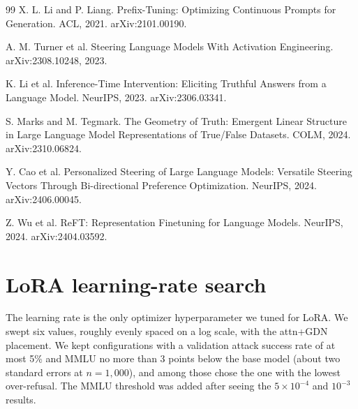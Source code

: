 \documentclass{article}
\begin{document}
\begin{thebibliography}{99}
 X. L. Li and P. Liang. Prefix-Tuning: Optimizing Continuous Prompts for Generation. ACL, 2021. arXiv:2101.00190.

 A. M. Turner et al. Steering Language Models With Activation Engineering. arXiv:2308.10248, 2023.

 K. Li et al. Inference-Time Intervention: Eliciting Truthful Answers from a Language Model. NeurIPS, 2023. arXiv:2306.03341.

 S. Marks and M. Tegmark. The Geometry of Truth: Emergent Linear Structure in Large Language Model Representations of True/False Datasets. COLM, 2024. arXiv:2310.06824.

 Y. Cao et al. Personalized Steering of Large Language Models: Versatile Steering Vectors Through Bi-directional Preference Optimization. NeurIPS, 2024. arXiv:2406.00045.

 Z. Wu et al. ReFT: Representation Finetuning for Language Models. NeurIPS, 2024. arXiv:2404.03592.

\end{thebibliography}
\clearpage
\appendix
\renewcommand{\thetable}{\thesection\arabic{table}}
\section{LoRA learning-rate search}\label{app:A}

The learning rate is the only optimizer hyperparameter we tuned for LoRA. We swept six values, roughly evenly spaced on a log scale, with the attn+GDN placement. We kept configurations with a validation attack success rate of at most 5\% and MMLU no more than 3 points below the base model (about two standard errors at $n = 1{,}000$), and among those chose the one with the lowest over-refusal. The MMLU threshold was added after seeing the $5\times10^{-4}$ and $10^{-3}$ results.
\end{document}
